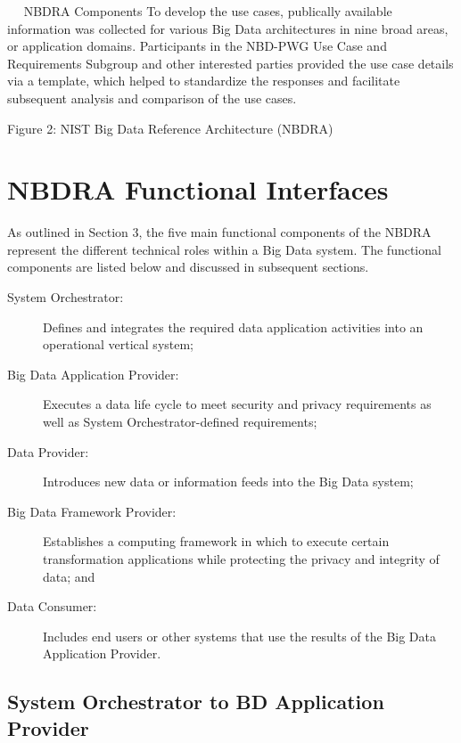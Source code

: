 \documentclass[11pt]{article}
\begin{document}
 
NBDRA Components
To develop the use cases, publically available information was collected for various Big Data 
architectures in nine broad areas, or application domains. Participants in the NBD-PWG Use Case and 
Requirements Subgroup and other interested parties provided the use case details via a template, which 
helped to standardize the responses and facilitate subsequent analysis and comparison of the use cases. 

Figure 2: NIST Big Data Reference Architecture (NBDRA)

\section{NBDRA Functional Interfaces}

As outlined in Section 3, the five main functional components of the NBDRA represent the different 
technical roles within a Big Data system. The functional components are listed below and discussed in 
subsequent sections.

\begin{description}

\item [System Orchestrator:] Defines and integrates the required data
  application activities into an operational vertical system;

\item [Big Data Application Provider:] Executes a data life cycle to
  meet security and privacy requirements as well as System
  Orchestrator-defined requirements;

\item [Data Provider:] Introduces new data or information feeds into
  the Big Data system;

\item [Big Data Framework Provider:] Establishes a computing framework
  in which to execute certain transformation applications while
  protecting the privacy and integrity of data; and

\item [Data Consumer:] Includes end users or other systems that use
  the results of the Big Data Application Provider.

\end{description}



\subsection{System Orchestrator to BD Application Provider }
\end{document}
